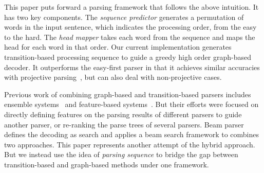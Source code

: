 This paper puts forward a parsing framework that follows the above
intuition. It has two key components. The {\em sequence predictor}
generates a permutation of words in the input sentence,
which indicates the processing order, from the easy to the hard.
The {\em head mapper} takes each word from the
sequence and maps the head for each word in that order.
Our current implementation generates transition-based processing sequence
to guide a greedy high order graph-based decoder.
It outperforms the easy-first parser
in that it achieves similar accuracies with projective
parsing~\cite{kong2014empirical}, but can also deal with non-projective cases.

Previous work of combining graph-based and transition-based parsers includes
ensemble systems~\cite{Sagae:2006:PCR:1614049.1614082}
and feature-based systems~\cite{nivre2008integrating}.
But their efforts were focused on directly defining features on
the parsing results of different parsers to guide another parser,
or re-ranking the parse trees of several parsers.
Beam parser~\cite{zhang2008tale} defines the decoding as search and
applies a beam search framework to combines two approaches.
This paper represents another attempt of the hybrid approach.
But we instead use the idea of \textit{parsing sequence} to bridge
the gap between transition-based and graph-based methods under one framework.

